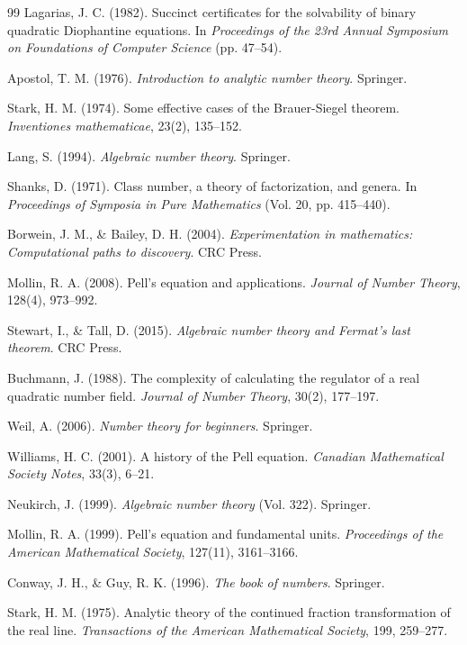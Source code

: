 \documentclass[12pt]{article}
\begin{document}
\begin{thebibliography}{99}
Lagarias, J. C. (1982). Succinct certificates for the solvability of binary quadratic Diophantine equations. In \emph{Proceedings of the 23rd Annual Symposium on Foundations of Computer Science} (pp. 47--54).

Apostol, T. M. (1976). \emph{Introduction to analytic number theory}. Springer.

Stark, H. M. (1974). Some effective cases of the Brauer-Siegel theorem. \emph{Inventiones mathematicae}, 23(2), 135--152.

Lang, S. (1994). \emph{Algebraic number theory}. Springer.

Shanks, D. (1971). Class number, a theory of factorization, and genera. In \emph{Proceedings of Symposia in Pure Mathematics} (Vol. 20, pp. 415--440).

Borwein, J. M., \& Bailey, D. H. (2004). \emph{Experimentation in mathematics: Computational paths to discovery}. CRC Press.

Mollin, R. A. (2008). Pell's equation and applications. \emph{Journal of Number Theory}, 128(4), 973--992.

Stewart, I., \& Tall, D. (2015). \emph{Algebraic number theory and Fermat's last theorem}. CRC Press.

Buchmann, J. (1988). The complexity of calculating the regulator of a real quadratic number field. \emph{Journal of Number Theory}, 30(2), 177--197.

Weil, A. (2006). \emph{Number theory for beginners}. Springer.

Williams, H. C. (2001). A history of the Pell equation. \emph{Canadian Mathematical Society Notes}, 33(3), 6--21.

Neukirch, J. (1999). \emph{Algebraic number theory} (Vol. 322). Springer.

Mollin, R. A. (1999). Pell's equation and fundamental units. \emph{Proceedings of the American Mathematical Society}, 127(11), 3161--3166.

Conway, J. H., \& Guy, R. K. (1996). \emph{The book of numbers}. Springer.

Stark, H. M. (1975). Analytic theory of the continued fraction transformation of the real line. \emph{Transactions of the American Mathematical Society}, 199, 259--277.


\end{thebibliography}
\end{document}
